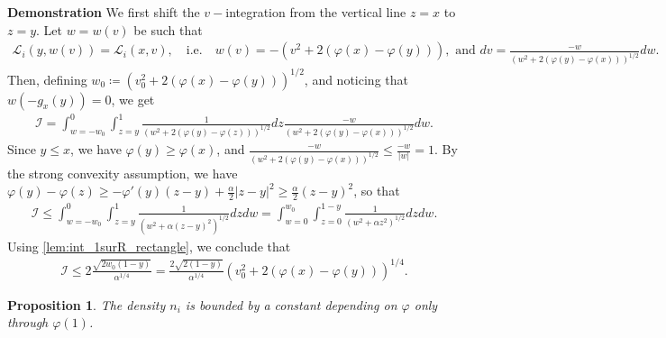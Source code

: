 \documentclass{article}
\newtheorem{proposition}{Proposition}[section]
\numberwithin{equation}{section}
\newcommand{\myproof}[1]{
	\noindent \textbf{Demonstration}
	{\small	#1 \hfill \qedsymbol}
}
\begin{document}
\myproof{
	We first shift the $v-$integration from the vertical line $z=x$ to $z=y$. Let $w = w(v)$ be such that
	\begin{align*}
		\mathcal{L}_i(y,w(v)) = \mathcal{L}_i(x,v), \quad \text{i.e.} \quad w(v) = -\left(v^2 + 2 \left(\varphi(x) - \varphi(y)\right)\right), \text{ and } dv = \frac{-w}{\left(w^2 + 2 \left(\varphi(y) - \varphi(x)\right)\right)^{1/2}}  dw.
	\end{align*}
	Then, defining $w_0 \coloneqq \left(v_0^2 + 2 \left(\varphi(x) - \varphi(y)\right)\right)^{1/2}$, and noticing that $w(-g_x(y)) = 0$, we get
	\begin{align*}
		\mathcal{I} = \int_{w=-w_0}^{0} \int_{z=y}^{1} \frac{1}{\left(w^2 + 2 \left(\varphi(y) - \varphi(z)\right)\right)^{1/2}} dz \frac{-w}{\left(w^2 + 2 \left(\varphi(y) - \varphi(x)\right)\right)^{1/2}} dw.
	\end{align*}
	Since $y \leqslant x$, we have $\varphi(y) \geqslant \varphi(x)$, and $\frac{-w}{\left(w^2 + 2 \left(\varphi(y) - \varphi(x)\right)\right)^{1/2}} \leqslant \frac{-w}{|w|} = 1$. By the strong convexity assumption, we have $\varphi(y) - \varphi(z) \geqslant - \varphi'(y) (z - y) + \frac{\alpha}{2} |z - y|^2 \geqslant \frac{\alpha}{2} (z - y)^2$, so that
	\begin{align*}
		\mathcal{I} \leqslant \int_{w=-w_0}^{0} \int_{z=y}^{1} \frac{1}{\left(w^2 + \alpha (z- y)^2\right)^{1/2}} dz dw = \int_{w=0}^{w_0} \int_{z=0}^{1-y} \frac{1}{\left(w^2 + \alpha z^2\right)^{1/2}} dz dw.
	\end{align*}
	Using \cref{lem:int_1surR_rectangle}, we conclude that 
	\begin{align*}
		\mathcal{I} \leqslant 2 \frac{\sqrt{2 w_0 (1-y)}}{\alpha^{1/4}} = \frac{2\sqrt{2(1-y)}}{\alpha^{1/4}} \left(v_0^2 + 2 \left(\varphi(x) - \varphi(y)\right)\right)^{1/4}.
	\end{align*}
}

\begin{proposition}
	The density $n_i$ is bounded by a constant depending on $\varphi$ only through $\varphi(1)$.
\end{proposition}
\end{document}
